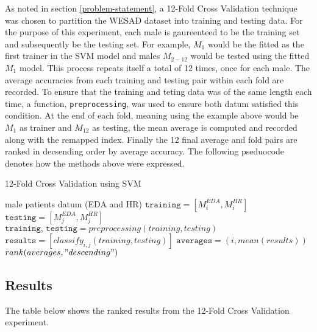 As noted in section \ref{problem-statement}, a 12-Fold Cross Validation technique was chosen 
to partition the WESAD dataset into training and testing data. For the purpose of 
this experiment, each male is gaureenteed to be the training set and subsequently be 
the testing set. For example, $M_1$ would be the fitted as the first trainer in 
the SVM model and males $M_{2-12}$ would be tested using the fitted $M_1$ model. 
This process repeats itself a total of 12 times, once for each male. The average 
accuracies from each training and testing pair within each fold are recorded. 
To ensure that the training and teting data was of the same length each time, 
a function, \texttt{preprocessing}, was used to ensure both datum satisfied this condition.
At the end of each fold, meaning using the example above would be $M_1$ 
as trainer and $M_{12}$ as testing, the mean average is computed and recorded 
along with the remapped index. Finally the 12 final average and fold pairs 
are ranked in decsending order by average accuracy. The following pseduocode 
denotes how the methods above were expressed. 

\begin{algorithm}
\caption{12-Fold Cross Validation using SVM}\label{12FCV}
\begin{algorithmic}[1]
\scriptsize
{} male patients datum (EDA and HR)
\State $\texttt{training} = [M_i^{EDA}, M_i^{HR}]$
 
\State $\texttt{testing} = [M_j^{EDA}, M_j^{HR}]$
\State $\texttt{training, testing} = preprocessing(training, testing)$
\EndIf
\State $\texttt{results} = [classify_{i,j}(training, testing)]$
\EndFor
\State $\texttt{averages} = (i,mean(results))$ 
\EndFor
\State $rank(averages, "descending")$
\end{algorithmic}
\end{algorithm}


\subsection{Results}
\label{sec:Results}

The table below shows the ranked results from the 12-Fold Cross Validation experiment.

